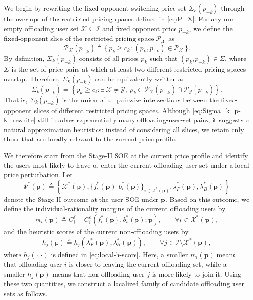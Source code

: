 \documentclass[lettersize,journal]{IEEEtran}
\begin{document}
We begin by rewriting the fixed-opponent switching-price set $\Sigma_k(p_{-k})$ through the overlaps of the restricted pricing spaces defined in \eqref{eq:P_X}. For any non-empty offloading user set $\mathcal{X}\subseteq\mathcal{I}$ and fixed opponent price $p_{-k}$, we define the fixed-opponent slice of the restricted pricing space $\mathcal{P}_{\mathcal{X}}$ as
\begin{equation}\label{eq:PY-fixed-opponent}
\mathcal{P}_{\mathcal{X}}(p_{-k})
\triangleq
\{\,p_k\ge c_k:\,(p_k,p_{-k})\in\mathcal{P}_{\mathcal{X}}\,\}.
\end{equation}
By definition, $\Sigma_k(p_{-k})$ consists of all prices $p_k$ such that $(p_k,p_{-k})\in\Sigma$, where $\Sigma$ is the set of price pairs at which at least two different restricted pricing spaces overlap. Therefore, $\Sigma_k(p_{-k})$ can be equivalently written as
\begin{equation}\label{eq:Sigma_k_p-k_rewrite}
\Sigma_k(p_{-k})
=
\left\{
p_k\ge c_k:
\exists\, \mathcal{X}\neq\mathcal{Y},\ 
p_k\in \mathcal{P}_{\mathcal{X}}(p_{-k})\cap \mathcal{P}_{\mathcal{Y}}(p_{-k})
\right\}.
\end{equation}
That is, $\Sigma_k(p_{-k})$ is the union of all pairwise intersections between the fixed-opponent slices of different restricted pricing spaces. Although \eqref{eq:Sigma_k_p-k_rewrite} still involves exponentially many offloading-user-set pairs, it suggests a natural approximation heuristics: instead of considering all slices, we retain only those that are locally relevant to the current price profile.

We therefore start from the Stage-II SOE at the current price profile and identify the users most likely to leave or enter the current offloading user set under a local price perturbation. Let
\[
\Psi^*(\boldsymbol{p})
\triangleq
\left\{
\mathcal{X}^{*}(\boldsymbol{p}),
\{f_i^{*}(\boldsymbol{p}),b_i^{*}(\boldsymbol{p})\}_{i\in\mathcal{X}^{*}(\boldsymbol{p})},
\lambda_F^{*}(\boldsymbol{p}),
\lambda_B^{*}(\boldsymbol{p})
\right\}
\]
denote the Stage-II outcome at the user SOE under $\boldsymbol p$. Based on this outcome, we define the individual-rationality margins of the current offloading users by
\begin{equation}\label{eq:realized-margin}
m_i(\boldsymbol{p})
\triangleq
C_i^{\ell}-C_i^{e}\!\left(f_i^*(\boldsymbol{p}),b_i^*(\boldsymbol{p});\boldsymbol{p}\right),
\qquad
\forall i\in\mathcal{X}^*(\boldsymbol{p}),
\end{equation}
and the heuristic scores of the current non-offloading users by
\begin{equation}\label{eq:realized-score}
h_j(\boldsymbol{p})
\triangleq
h_j\!\left(\lambda_F^*(\boldsymbol{p}),\lambda_B^*(\boldsymbol{p})\right),
\qquad
\forall j\in\mathcal{I}\setminus\mathcal{X}^*(\boldsymbol{p}),
\end{equation}
where $h_j(\cdot,\cdot)$ is defined in \eqref{eq:local-h-score}. Here, a smaller $m_i(\boldsymbol p)$ means that offloading user $i$ is closer to leaving the current offloading set, while a smaller $h_j(\boldsymbol p)$ means that non-offloading user $j$ is more likely to join it. Using these two quantities, we construct a localized family of candidate offloading user sets as follows.
\end{document}
